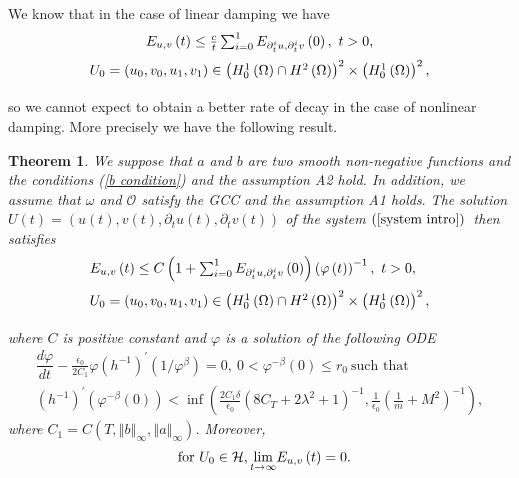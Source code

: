 \documentclass[11pt,reqno]{amsart}
\newtheorem{theorem}{Theorem}
\theoremstyle{plain}
\numberwithin{equation}{section}
\numberwithin{equation}{section}
\begin{document}
We know that in the case of linear damping we have%
\begin{equation*}
\begin{array}{c}
\medskip E_{u,v}\left( t\right) \leq \frac{c}{t}\sum_{i=0}^{1}E_{\partial
_{t}^{i}u,\partial _{t}^{i}v}\left( 0\right) ,~t>0, \\ 
\medskip U_{0}=\left( u_{0},v_{0},u_{1},v_{1}\right) \in \left(
H_{0}^{1}\left( \Omega \right) \cap H^{2}\left( \Omega \right) \right)
^{2}\times \left( H_{0}^{1}\left( \Omega \right) \right) ^{2},%
\end{array}%
\end{equation*}%
so we cannot expect to obtain a better rate of decay in the case of
nonlinear damping. More precisely we have the following result.

\begin{theorem}
We suppose that $a$ and $b$ are two smooth non-negative functions and the
conditions (\ref{b condition}) and the assumption A2 hold. In addition, we
assume that $\omega $ and $\mathcal{O}$ satisfy the GCC and the assumption
A1 holds$.$ The solution $U\left( t\right) =\left( u\left( t\right) ,v\left(
t\right) ,\partial _{t}u\left( t\right) ,\partial _{t}v\left( t\right)
\right) $ of the system $\left( \ref{system intro}\right) $\ then satisfies%
\begin{equation}
\begin{array}{l}
\medskip E_{u,v}\left( t\right) \leq C\left( 1+\sum_{i=0}^{1}E_{\partial
_{t}^{i}u,\partial _{t}^{i}v}\left( 0\right) \right) \left( \varphi \left(
t\right) \right) ^{-1},~t>0, \\ 
\medskip U_{0}=\left( u_{0},v_{0},u_{1},v_{1}\right) \in \left(
H_{0}^{1}\left( \Omega \right) \cap H^{2}\left( \Omega \right) \right)
^{2}\times \left( H_{0}^{1}\left( \Omega \right) \right) ^{2},%
\end{array}
\label{energy decay rate}
\end{equation}%
where $C$ is positive constant and $\varphi $ is a solution of the following
ODE%
\begin{equation}
\begin{array}{l}
\dfrac{d\varphi }{dt}-\frac{\epsilon _{0}}{2C_{1}}\varphi \left(
h^{-1}\right) ^{\prime }\left( 1/\varphi ^{\beta }\right) =0,~0<\varphi
^{-\beta }\left( 0\right) \leq r_{0}~\text{such that} \\ 
\left( h^{-1}\right) ^{\prime }\left( \varphi ^{-\beta }\left( 0\right)
\right) <\inf \left( \frac{2C_{1}\delta }{\epsilon _{0}}\left(
8C_{T}+2\lambda ^{2}+1\right) ^{-1},\frac{1}{\epsilon _{0}}\left( \frac{1}{m}%
+M^{2}\right) ^{-1}\right) ,%
\end{array}
\label{ode theorem 1}
\end{equation}%
where $C_{1}=C\left( T,\left\Vert b\right\Vert _{\infty },\left\Vert
a\right\Vert _{\infty }\right) $. Moreover, 
\begin{equation}
\begin{array}{c}
\text{for }U_{0}\in \mathcal{H},\underset{t\rightarrow \infty }{\lim }%
\medskip E_{u,v}\left( t\right) =0.%
\end{array}
\label{limit energy space}
\end{equation}
\end{theorem}
\end{document}
